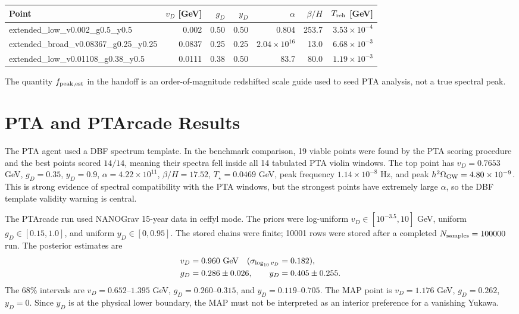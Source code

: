 \documentclass[11pt]{article}
\begin{document}
\begin{center}
\begin{tabular}{lrrrrrr}
\toprule
Point & \(v_D\) [GeV] & \(g_D\) & \(y_D\) & \(\alpha\) & \(\beta/H\) & \(T_{\rm reh}\) [GeV] \\
\midrule
extended\_low\_v0.002\_g0.5\_y0.5 & 0.002 & 0.50 & 0.50 & 0.804 & 253.7 & \(3.53\times10^{-4}\) \\
extended\_broad\_v0.08367\_g0.25\_y0.25 & 0.0837 & 0.25 & 0.25 & \(2.04\times10^{16}\) & 13.0 & \(6.68\times10^{-3}\) \\
extended\_low\_v0.01108\_g0.38\_y0.5 & 0.0111 & 0.38 & 0.50 & 83.7 & 80.0 & \(1.19\times10^{-3}\) \\
\bottomrule
\end{tabular}
\end{center}
The quantity \(f_{\rm peak,est}\) in the handoff is an order-of-magnitude redshifted scale guide used to seed PTA analysis, not a true spectral peak.

\section{PTA and PTArcade Results}
The PTA agent used a DBF spectrum template.  In the benchmark comparison, 19 viable points were found by the PTA scoring procedure and the best points scored \(14/14\), meaning their spectra fell inside all 14 tabulated PTA violin windows.  The top point has \(v_D=0.7653\) GeV, \(g_D=0.35\), \(y_D=0.9\), \(\alpha=4.22\times10^{11}\), \(\beta/H=17.52\), \(T_\star=0.0469\) GeV, peak frequency \(1.14\times10^{-8}\) Hz, and peak \(h^2\Omega_{\rm GW}=4.80\times10^{-9}\).  This is strong evidence of spectral compatibility with the PTA windows, but the strongest points have extremely large \(\alpha\), so the DBF template validity warning is central.

The PTArcade run used NANOGrav 15-year data in ceffyl mode.  The priors were log-uniform \(v_D\in[10^{-3.5},10]\) GeV, uniform \(g_D\in[0.15,1.0]\), and uniform \(y_D\in[0,0.95]\).  The stored chains were finite; 10001 rows were stored after a completed \(N_{\rm samples}=100000\) run.  The posterior estimates are
\begin{align}
v_D &= 0.960 \ {\rm GeV}\quad(\sigma_{\log_{10}v_D}=0.182),\\
g_D &= 0.286 \pm 0.026,\qquad
y_D = 0.405 \pm 0.255 .
\end{align}
The 68\% intervals are \(v_D=0.652\)--\(1.395\) GeV, \(g_D=0.260\)--\(0.315\), and \(y_D=0.119\)--\(0.705\).  The MAP point is \(v_D=1.176\) GeV, \(g_D=0.262\), \(y_D=0\).  Since \(y_D\) is at the physical lower boundary, the MAP must not be interpreted as an interior preference for a vanishing Yukawa.
\end{document}
